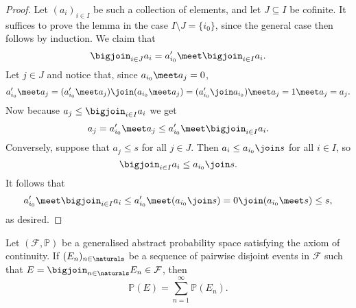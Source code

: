 \documentclass[article, a4paper, 11pt, oneside]{memoir}
\numberwithin{equation}{chapter}
\newcommand{\calF}{\mathcal{F}}
\renewcommand{\P}{\mathbb{P}}
\begin{document}
\begin{proof}
    Let $(a_i)_{i \in I}$ be such a collection of elements, and let $J \subseteq I$ be cofinite. It suffices to prove the lemma in the case $I \setminus J = \{i_0\}$, since the general case then follows by induction. We claim that
    \begin{equation*}
        \bigjoin_{i \in J} a_i
            = a_{i_0}' \meet \bigjoin_{i \in I} a_i.
    \end{equation*}
    Let $j \in J$ and notice that, since $a_{i_0} \meet a_j = 0$,
    \begin{equation*}
        a_{i_0}' \meet a_j
            = (a_{i_0}' \meet a_j) \join (a_{i_0} \meet a_j)
            = (a_{i_0}' \join a_{i_0}) \meet a_j
            = 1 \meet a_j
            = a_j.
    \end{equation*}
    Now because $a_j \leq \bigjoin_{i \in I} a_i$ we get
    \begin{equation*}
        a_j
            = a_{i_0}' \meet a_j
            \leq a_{i_0}' \meet \bigjoin_{i \in I} a_i.
    \end{equation*}
    Conversely, suppose that $a_j \leq s$ for all $j \in J$. Then $a_i \leq a_{i_0} \join s$ for all $i \in I$, so
    \begin{equation*}
        \bigjoin_{i \in I} a_i
            \leq a_{i_0} \join s.
    \end{equation*}
    It follows that
    \begin{equation*}
        a_{i_0}' \meet \bigjoin_{i \in I} a_i
            \leq a_{i_0}' \meet (a_{i_0} \join s)
            = 0 \join (a_{i_0} \meet s)
            \leq s,
    \end{equation*}
    as desired.
\end{proof}


\begin{proposition}
    Let $(\calF, \P)$ be a generalised abstract probability space satisfying the axiom of continuity. If $(E_n)_{n\in\naturals}$ be a sequence of pairwise disjoint events in $\calF$ such that $E = \bigjoin_{n\in\naturals} E_n \in \calF$, then
    \begin{equation*}
        \P(E)
            = \sum_{n=1}^\infty \P(E_n).
    \end{equation*}
\end{proposition}
\end{document}
